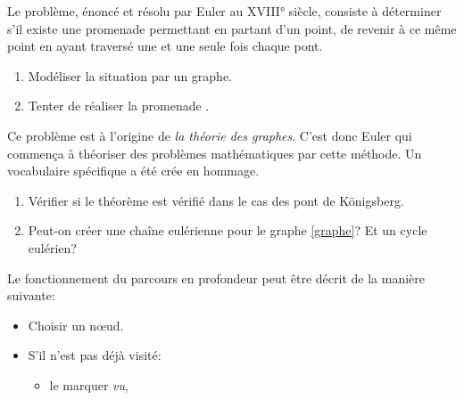 \documentclass[a4paper,11pt]{article}
\begin{document}
\begin{Form}
\begin{exo}
Le problème, énoncé et résolu par Euler au XVIII° siècle, consiste à déterminer s'il existe une promenade permettant en partant d'un point, de revenir à ce même point en ayant traversé une et une seule fois chaque pont.
\begin{enumerate}
\item Modéliser la situation par un graphe.
\item Tenter de réaliser la promenade .
\end{enumerate}
Ce problème est à l'origine de \emph{la théorie des graphes}. C'est donc Euler qui commença à théoriser des problèmes mathématiques par cette méthode. Un vocabulaire spécifique a été crée en hommage.
\begin{center}
\end{center}
\begin{enumerate}[resume]
\item Vérifier si le théorème est vérifié dans le cas des pont de Königsberg.
\item Peut-on créer une chaîne eulérienne pour le graphe \ref{graphe}? Et un cycle eulérien?
\end{enumerate}
\end{exo}
\begin{exo}
Le fonctionnement du parcours en profondeur peut être décrit de la manière suivante:
\begin{itemize}
\item Choisir un nœud.
\item S'il n'est pas déjà visité:
\begin{itemize}
\item le marquer \emph{vu},

\end{itemize}
\end{itemize}
\end{exo}
\end{Form}
\end{document}
